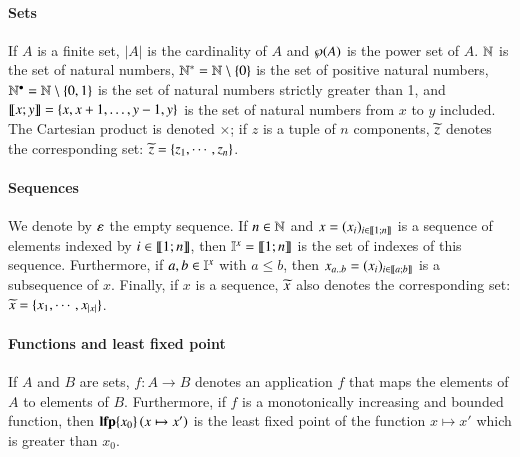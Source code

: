 \paragraph*{Sets}
If $A$ is a finite set,
$|A|$ is the cardinality of $A$
and $\wp(A)$ is the power set of $A$.
$\mathbb{N}$ is the set of natural numbers,
$\mathbb{N}^* = \mathbb{N} \setminus \{ 0 \}$ is the set of positive natural numbers,
$\mathbb{N}^\bullet = \mathbb{N} \setminus \{ 0, 1 \}$ is the set of natural numbers strictly greater than 1,
and $\llbracket x; y \rrbracket = \{ x, x+1, \dots, y-1, y \}$ is the set of natural numbers from $x$ to $y$ included.
The Cartesian product is denoted $\times$;
if $z$ is a tuple of $n$ components, $\widetilde{z}$ denotes the corresponding set:
$\widetilde{z} = \{z_1, \cdots, z_n\}$.

\paragraph*{Sequences}
We denote by $\varepsilon$ the empty sequence.
If $n \in \mathbb{N}$ and
$x = (x_i)_{i \in \llbracket 1; n \rrbracket}$ is a sequence of elements indexed by $i \in \llbracket 1; n \rrbracket$,
then $\mathbb{I}^{x} = \llbracket 1; n \rrbracket$ is the set of indexes of this sequence.
Furthermore, if $a, b \in \mathbb{I}^{x}$ with $a \leq b$,
then $x_{a..b} = (x_i)_{i \in \llbracket a; b \rrbracket}$ is a subsequence of $x$.
Finally, if $x$ is a sequence, $\widetilde{x}$ also denotes the corresponding set:
$\widetilde{x} = \{x_1, \cdots, x_{|x|}\}$.

\paragraph*{Functions and least fixed point}
If $A$ and $B$ are sets,
$f : A \rightarrow B$ denotes an application $f$ that maps the elements of $A$ to elements of $B$.
Furthermore, if $f$ is a monotonically increasing and bounded function, then
$\mathbf{lfp}\{x_0\}\left(x\mapsto x'\right)$ is the least fixed point of the function $x \mapsto x'$ which is greater than $x_0$.
